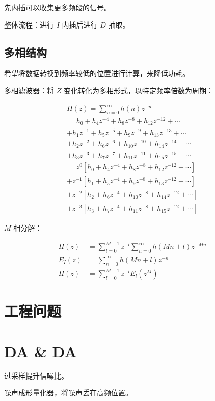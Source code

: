 \documentclass[cn,11pt,chinese,black,simple]{../elegantbook}
\begin{document}
先内插可以收集更多频段的信号。

整体流程：进行 \(I\) 内插后进行 \(D\) 抽取。

\subsection{多相结构}

希望将数据转换到频率较低的位置进行计算，来降低功耗。

多相滤波器：将 \(Z\) 变化转化为多相形式，以特定频率倍数为周期：

\[\begin{array}{l}
    H(z)=\sum_{n=0}^{\infty} h(n) z^{-n} \\
    =h_{0}+h_{4} z^{-4}+h_{8} z^{-8}+h_{12} z^{-12}+\cdots \\
    +h_{1} z^{-1}+h_{5} z^{-5}+h_{9} z^{-9}+h_{13} z^{-13}+\cdots \\
    +h_{2} z^{-2}+h_{6} z^{-6}+h_{10} z^{-10}+h_{14} z^{-14}+\cdots \\
    +h_{3} z^{-3}+h_{7} z^{-7}+h_{11} z^{-11}+h_{15} z^{-15}+\cdots \\
    =z^{0}\left[h_{0}+h_{4} z^{-4}+h_{8} z^{-8}+h_{12} z^{-12}+\cdots\right] \\
    +z^{-1}\left[h_{1}+h_{5} z^{-4}+h_{9} z^{-8}+h_{13} z^{-12}+\cdots\right] \\
    +z^{-2}\left[h_{2}+h_{6} z^{-4}+h_{10} z^{-8}+h_{14} z^{-12}+\cdots\right] \\
    +z^{-3}\left[h_{3}+h_{7} z^{-4}+h_{11} z^{-8}+h_{15} z^{-12}+\cdots\right]
\end{array}\]

\(M\) 相分解：

\[\begin{aligned}
    H(z) &=\sum_{l=0}^{M-1} z^{-l} \sum_{n=0}^{\infty} h(M n+l) z^{-M n} \\
    E_{I}(z) &=\sum_{n=0}^{\infty} h(M n+l) z^{-n} \\
    H(z) &=\sum_{l=0}^{M-1} z^{-l} E_{l}\left(z^{M}\right)
\end{aligned}\]


\section{工程问题}

\section{DA \& DA} 

过采样提升信噪比。

噪声成形量化器，将噪声丢在高频位置。


\let\chapname\undefined
\ifx\mainclass\undefined
\end{document}
